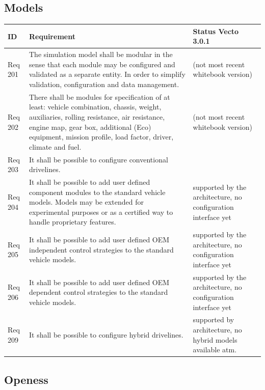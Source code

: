 \subsection{Models} %
\label{sub:models}

\begin{tabular}{L{\IdColWidth}|L{\ReqColWidth}|M{\StatusColWidth}}
ID & Requirement & Status Vecto 3.0.1 \\ \hline\hline
Req 201 & The simulation model shall be modular in the sense that each module may be configured and validated as a separate entity.	In order to simplify validation, configuration and data management. & 
	\Vcheck \newline (not most recent whitebook version)	\\ \hline
Req 202 & There shall be modules for specification of at least: vehicle combination, chassis, weight, auxiliaries, rolling resistance, air resistance, engine map, gear box, additional (Eco) equipment, mission profile, load factor, driver, climate and fuel. 	& 
	\Vcheck \newline (not most recent whitebook version)	\\ \hline
Req 203 & It shall be possible to configure conventional drivelines.	& 
	\Vcheck	\\ \hline
Req 204 & It shall be possible to add user defined component modules to the standard vehicle models.	Models may be extended for experimental purposes or as a certified way to handle proprietary features. & 
	supported by the architecture, no configuration interface yet	\\ \hline
Req 205 & It shall be possible to add user defined OEM independent control strategies to the standard vehicle models.	& 
	supported by the architecture, no configuration interface yet	\\ \hline
Req 206 & It shall be possible to add user defined OEM dependent control strategies to the standard vehicle models.	& 
	supported by the architecture, no configuration interface yet	\\ \hline
Req 209 & It shall be possible to configure hybrid drivelines.	& 
	supported by architecture, no hybrid models available atm.	\\ \hline
\end{tabular}

\subsection{Openess} %
\label{sub:openess}

